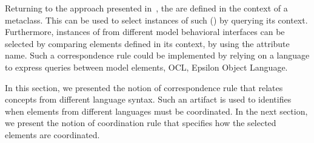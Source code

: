 Returning to the approach presented in~\cite{sle13-combemale}, the \dse are defined in the context of a metaclass. This can be used to select instances of such \dse (\mse) by querying its context. Furthermore, instances of \dse from different model behavioral interfaces can be selected by comparing elements defined in its context, \ie by using the attribute name. Such a correspondence rule could be implemented by relying on a language to express queries between model elements, \eg OCL, Epsilon Object Language.

In this section, we presented the notion of correspondence rule that relates concepts from different language syntax. Such an artifact is used to identifies when elements from different languages must be coordinated. In the next section, we present the notion of coordination rule that specifies how the selected elements are coordinated.      
			
			
						 
							
						
				